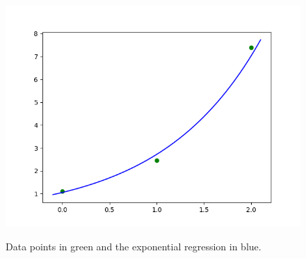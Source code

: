 \documentclass[12pt]{article}
\begin{document}
\begin{figure}[H]
	\caption{Data points in green and the exponential regression in blue.}
	\includegraphics[width=.75\textwidth]{hw1_figure_1.png}
	\label{p1_T_err}
	\centering
\end{figure}
\end{document}
